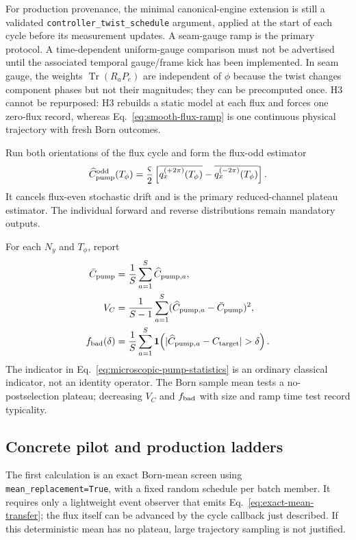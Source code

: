 \documentclass[aps,prb,onecolumn,nofootinbib,superscriptaddress]{revtex4-2}
\newcommand{\Tr}{\operatorname{Tr}}
\newcommand{\code}[1]{\texttt{#1}}
\begin{document}
For production provenance, the minimal canonical-engine extension is still a
validated \code{controller\_twist\_schedule} argument, applied at the start of
each cycle before its measurement updates.  A seam-gauge ramp is the primary
protocol.  A time-dependent uniform-gauge comparison must not be advertised
until the associated temporal gauge/frame kick has been implemented.  In seam
gauge, the weights $\Tr(R_aP_e)$ are independent of $\phi$ because the twist
changes component phases but not their magnitudes; they can be precomputed
once.  H3 cannot be repurposed: H3 rebuilds a static model at each flux and
forces one zero-flux record, whereas Eq.~\eqref{eq:smooth-flux-ramp} is one
continuous physical trajectory with fresh Born outcomes.

Run both orientations of the flux cycle and form the flux-odd estimator
\begin{equation}
  \widehat C^{\rm odd}_{\rm pump}(T_\phi)
  =\frac{\varsigma}{2}
  \left[
    \overline{q_x^{(+2\pi)}(T_\phi)}
    -\overline{q_x^{(-2\pi)}(T_\phi)}
  \right].
  \label{eq:microscopic-odd-pump-estimator}
\end{equation}
It cancels flux-even stochastic drift and is the primary reduced-channel
plateau estimator.  The individual forward and reverse distributions remain
mandatory outputs.

For each $N_y$ and $T_\phi$, report
\begin{align}
  \bar C_{\rm pump}
  &=\frac1S\sum_{a=1}^{S}\widehat C_{{\rm pump},a},\nonumber\\
  V_C
  &=\frac1{S-1}\sum_{a=1}^{S}
    (\widehat C_{{\rm pump},a}-\bar C_{\rm pump})^2,\nonumber\\
  f_{\rm bad}(\delta)
  &=\frac1S\sum_{a=1}^{S}
    \mathbf{1}\!\left(
      |\widehat C_{{\rm pump},a}-C_{\rm target}|>\delta
    \right).
  \label{eq:microscopic-pump-statistics}
\end{align}
The indicator in Eq.~\eqref{eq:microscopic-pump-statistics} is an ordinary
classical indicator, not an identity operator.  The Born sample mean tests a
no-postselection plateau; decreasing $V_C$ and $f_{\rm bad}$ with size and
ramp time test record typicality.

\subsection{Concrete pilot and production ladders}

The first calculation is an exact Born-mean screen using
\code{mean\_replacement=True}, with a fixed random schedule per batch member.
It requires only a lightweight event observer that emits
Eq.~\eqref{eq:exact-mean-transfer}; the flux itself can be advanced by the
cycle callback just described.  If this deterministic mean has no plateau,
large trajectory sampling is not justified.
\end{document}
